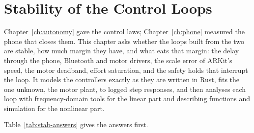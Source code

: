 
\chapter{Stability of the Control Loops}
\label{ch:stability}

Chapter~\ref{ch:autonomy} gave the control laws; Chapter~\ref{ch:phone} measured the phone that closes them.
This chapter asks whether the loops built from the two are stable, how much margin they have, and what eats that margin: the delay through the phone, Bluetooth and motor drivers, the scale error of ARKit's speed, the motor deadband, effort saturation, and the safety holds that interrupt the loop.
It models the controllers exactly as they are written in Rust, fits the one unknown, the motor plant, to logged step responses, and then analyses each loop with frequency-domain tools for the linear part and describing functions and simulation for the nonlinear part.

Table~\ref{tab:stab-answers} gives the answers first.

